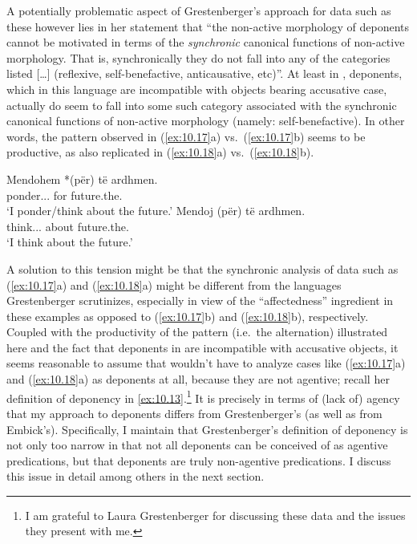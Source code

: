 \documentclass[output=paper]{langsci/langscibook}
\begin{document}
A potentially problematic aspect of Grestenberger’s approach for data such as
these however lies in her statement that “the non-active morphology of
deponents cannot be motivated in terms of the \emph{synchronic} canonical
functions of non-active morphology. That is, synchronically they do not fall
into any of the categories listed […] (reflexive, self-benefactive,
anticausative, etc)”. At least in , deponents, which in this language
are incompatible with objects bearing accusative case, actually do seem to fall
into some such category associated with the synchronic canonical functions of
non-active morphology (namely: self-benefactive). In other words, the pattern
observed in (\ref{ex:10.17}a) vs.\ (\ref{ex:10.17}b) seems to be productive, as
also replicated in (\ref{ex:10.18}a) vs.\ (\ref{ex:10.18}b).

\ea\label{ex:10.18} 
    \ea
    \gll    Mendohem *(për) {të ardhmen}.\\
            ponder.\Fsg.\Prs.\Nact{} \hphantom{*(}for    future.the.\Acc{}\\
    \glt    ‘I ponder/think about the future.’
    \ex
    \gll    Mendoj (për) {të ardhmen}.\\
            think.\Fsg.\Prs.\Act{}  \hphantom{(}about future.the.\Acc{}\\
    \glt    ‘I think about the future.’
    \z
\z

A solution to this tension might be that the synchronic analysis of data such
as (\ref{ex:10.17}a) and (\ref{ex:10.18}a) might be different from the
languages Grestenberger scrutinizes, especially in view of the
\enquote{affectedness} ingredient in these examples as opposed to
(\ref{ex:10.17}b) and (\ref{ex:10.18}b), respectively. Coupled with the
productivity of the pattern (i.e.\ the alternation) illustrated here and the
fact that deponents in  are incompatible with accusative objects, it
seems reasonable to assume that \citet{Grestenberger2018a} wouldn’t have to
analyze cases like (\ref{ex:10.17}a) and (\ref{ex:10.18}a) as deponents
at all, because they are not agentive; recall her definition of deponency in
\eqref{ex:10.13}.\footnote{I am grateful to Laura Grestenberger for
discussing these data and the issues they present with me.} It is precisely in
terms of (lack of) agency that my approach to deponents differs from
Grestenberger’s (as well as from Embick’s). Specifically, I maintain that
Grestenberger’s definition of deponency is not only too narrow in that not all
deponents can be conceived of as agentive predications, but that deponents are
truly non-agentive predications. I discuss this issue in detail among others in
the next section.
\end{document}

